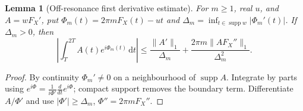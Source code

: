 \documentclass[11pt,reqno]{amsart}
\numberwithin{equation}{section}
\theoremstyle{plain}
\newtheorem{lemma}[theorem]{Lemma}
\theoremstyle{definition}
\theoremstyle{remark}
\newcommand{\dd}{\,\mathrm d}
\newcommand{\supp}{\operatorname{supp}}
\begin{document}
\begin{lemma}[Off-resonance first derivative estimate]\label{lem:ibp}
For $m\ge1$, real $u$, and $A=wF_X'$, put
$\Phi_m(t)=2\pi mF_X(t)-ut$ and
$\Delta_m=\inf_{t\in\supp w}|\Phi_m'(t)|$. If $\Delta_m>0$, then
\begin{equation}\label{eq:ibp}
\left|\int_T^{2T} A(t)e^{i\Phi_m(t)}\dd t\right|
\le\frac{\|A'\|_1}{\Delta_m}
+\frac{2\pi m\|AF_X''\|_1}{\Delta_m^2}.
\end{equation}
\end{lemma}
\begin{proof}
By continuity $\Phi_m'\neq0$ on a neighbourhood of $\supp A$. Integrate by parts using $e^{i\Phi}=\frac1{i\Phi'}\frac{d}{dt}e^{i\Phi}$; compact support removes the boundary term. Differentiate $A/\Phi'$ and use $|\Phi'|\ge\Delta_m$, $\Phi''=2\pi mF_X''$.
\end{proof}
\end{document}

